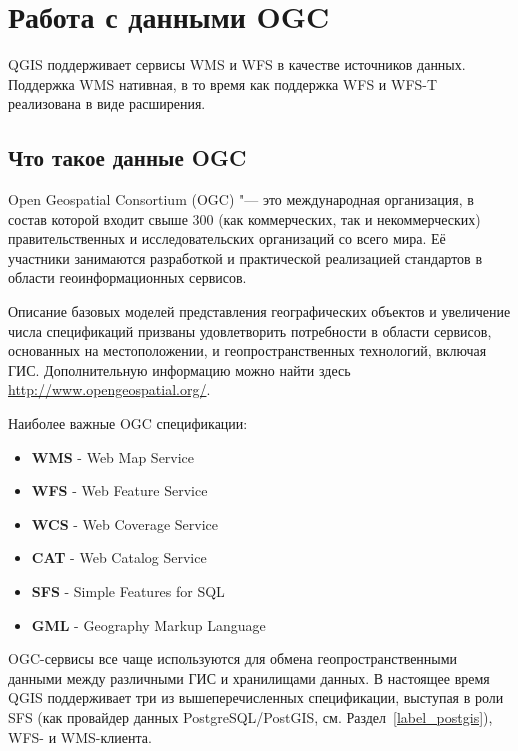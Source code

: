\chapter{Работа с данными OGC}\label{working_with_ogc}


QGIS поддерживает сервисы WMS и WFS в качестве источников данных. Поддержка
WMS нативная, в то время как поддержка WFS и WFS-T реализована в виде
расширения.

\section{Что такое данные OGC}

Open Geospatial Consortium (OGC) "--- это международная организация, в состав
которой входит свыше 300 (как коммерческих, так и некоммерческих)
правительственных и исследовательских организаций со всего мира. Её участники
занимаются разработкой и практической реализацией стандартов в области
геоинформационных сервисов.

Описание базовых моделей представления географических объектов и
увеличение числа спецификаций призваны удовлетворить потребности
в области сервисов, основанных на местоположении, и геопространственных
технологий, включая ГИС. Дополнительную информацию можно найти здесь
\url{http://www.opengeospatial.org/}.

Наиболее важные OGC спецификации:

\begin{itemize}[label=--]
\item \textbf{WMS} - Web Map Service
\item \textbf{WFS} - Web Feature Service
\item \textbf{WCS} - Web Coverage Service
\item \textbf{CAT} - Web Catalog Service
\item \textbf{SFS} - Simple Features for SQL
\item \textbf{GML} - Geography Markup Language
\end{itemize}

OGC-сервисы все чаще используются для обмена геопространственными
данными между различными ГИС и хранилищами данных. В настоящее время QGIS
поддерживает три из вышеперечисленных спецификации, выступая в роли SFS
(как провайдер данных PostgreSQL/PostGIS, см. Раздел~\ref{label_postgis}),
WFS- и WMS-клиента.

